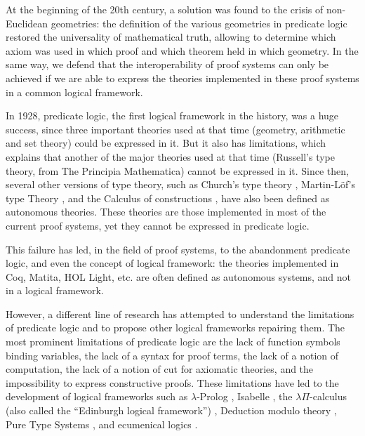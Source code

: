 At the beginning of the 20th century, a solution was found to the
crisis of non-Euclidean geometries: the definition of the various
geometries in predicate logic \cite{HilbertAckermann} restored the
universality of mathematical truth, allowing to determine which axiom
was used in which proof and which theorem held in which geometry.
In the same way, we defend that the interoperability of
proof systems can only be achieved if we are able to express the
theories implemented in these proof systems in a common logical
framework.

In 1928, predicate logic, the first logical framework in the history,
was a huge success, since three important theories used at that time
(geometry, arithmetic and set theory) could be expressed in it. But it
also has limitations, which explains that another of the major
theories used at that time (Russell's type theory, from The Principia
Mathematica) cannot be expressed in it. Since then, several other
versions of type theory, such as Church's type theory \cite{Church40},
Martin-L\"of's type Theory \cite{Martin-Lof84}, and the Calculus of
constructions \cite{CoquandHuet88}, have also been defined as
autonomous theories. These theories are those implemented in most
of the current proof systems, yet they cannot be expressed in
predicate logic.

This failure has led, in the field of proof systems, to the
abandonment predicate logic, and even the concept of logical
framework: the theories implemented in {\textsf Coq}, {\textsf Matita}, {\textsf
  HOL Light}, etc. are often defined as autonomous systems, and not in
a logical framework.

However, a different line of research has attempted to understand the
limitations of predicate logic and to propose other logical frameworks
repairing them. The most prominent limitations of predicate logic are
the lack of function symbols binding variables, the lack of a syntax
for proof terms, the lack of a notion of computation, the lack of a
notion of cut for axiomatic theories, and the impossibility to express
constructive proofs. These limitations have led to the development of
logical frameworks such as $\lambda$-Prolog \cite{NadathurMiller88,
  MillerNadathur12}, Isabelle \cite{Paulson90}, the $\lambda
\Pi$-calculus (also called the ``Edinburgh logical framework'')
\cite{HarperHonsellPlotkin91}, Deduction modulo theory
\cite{DowekHardinKirchner03, DowekWerner03}, Pure Type Systems
\cite{Berardi88,Terlouw89}, and ecumenical logics
\cite{Prawitz15,Dowek15,PereiraRodriguez17}.

